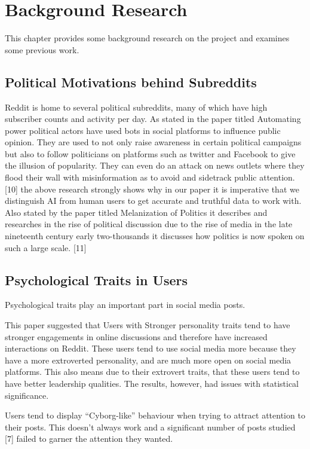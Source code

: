 \chapter{Background Research}\label{ch:Background}

This chapter provides some background research on the project and examines some previous work.

\section{Political Motivations behind Subreddits}
Reddit is home to several political subreddits, many of which have high subscriber counts and activity per day. As stated in the paper titled Automating power political actors have used bots in social platforms to influence public opinion. They are used to not only raise awareness in certain political campaigns but also to follow politicians on platforms such as twitter and Facebook to give the illusion of popularity. They can even do an attack on news outlets where they flood their wall with misinformation as to avoid and sidetrack public attention. [10] the above research strongly shows why in our paper it is imperative that we distinguish AI from human users to get accurate and truthful data to work with. Also stated by the paper titled Melanization of Politics it describes and researches in the rise of political discussion due to the rise of media in the late nineteenth century early two-thousands it discusses how politics is now spoken on such a large scale. [11]

\section{Psychological Traits in Users}
Psychological traits play an important part in social media posts.

This paper \cite{kilgo_ng_riedl_lacasa-mas_2018} suggested that Users with Stronger personality traits tend to have stronger engagements in online discussions and therefore have increased interactions on Reddit. These users tend to use social media more because they have a more extroverted personality, and are much more open on social media platforms. This also means due to their extrovert traits, that these users tend to have better leadership qualities. The results, however, had issues with statistical significance.

Users tend to display “Cyborg-like” behaviour when trying to attract attention to their posts. This doesn’t always work and a significant number of posts studied [7] failed to garner the attention they wanted. 

